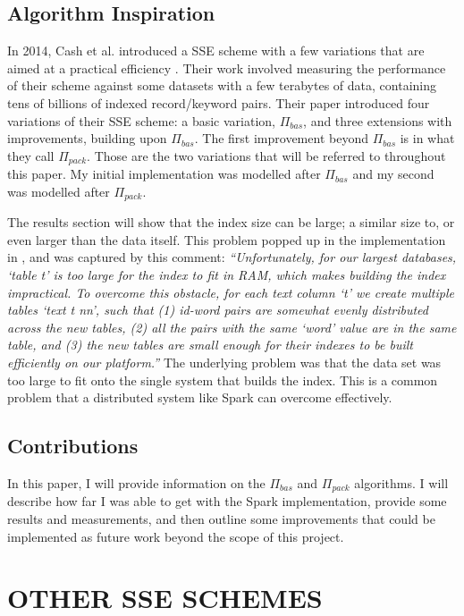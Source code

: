 \documentclass{sig-alternate-05-2015}
\begin{document}
\subsection{Algorithm Inspiration}
In 2014, Cash et al. introduced a SSE scheme with a few variations that are aimed at a practical efficiency \cite{davidcashetal.2014}. Their work involved measuring the performance of their scheme against some datasets with a few terabytes of data, containing tens of billions of indexed record/keyword pairs. Their paper introduced four variations of their SSE scheme: a basic variation, $\Pi_{bas}$, and three extensions with improvements, building upon $\Pi_{bas}$. The first improvement beyond $\Pi_{bas}$ is in what they call $\Pi_{pack}$. Those are the two variations that will be referred to throughout this paper. My initial implementation was modelled after $\Pi_{bas}$ and my second was modelled after $\Pi_{pack}$.

The results section will show that the index size can be large; a similar size to, or even larger than the data itself. This problem popped up in the implementation in \cite{davidcashetal.2014}, and was captured by this comment: \textit{``Unfortunately, for our largest databases, \lq{table t\rq} is too large for the index to fit in RAM, which makes building the index impractical. To overcome this obstacle, for each text column \lq{t\rq} we create multiple tables \lq{text t nn\rq}, such that (1) id-word pairs are somewhat evenly distributed across the new tables, (2) all the pairs with the same \lq{word\rq} value are in the same table, and (3) the new tables are small enough for their indexes to be built efficiently on our platform.''} The underlying problem was that the data set was too large to fit onto the single system that builds the index. This is a common problem that a distributed system like Spark can overcome effectively.

\subsection{Contributions}
In this paper, I will provide information on the $\Pi_{bas}$ and $\Pi_{pack}$ algorithms. I will describe how far I was able to get with the Spark implementation, provide some results and measurements, and then outline some improvements that could be implemented as future work beyond the scope of this project.

\section{OTHER SSE SCHEMES}
\end{document}
